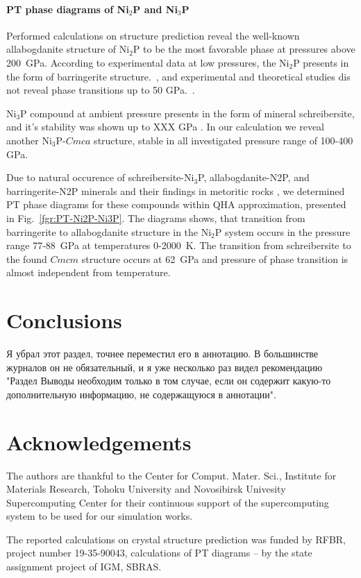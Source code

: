 \documentclass[twoside,twocolumn,9pt]{article}
\begin{document}
\paragraph{PT phase diagrams of Ni$_2$P and Ni$_3$P} 

Performed calculations on structure prediction reveal the well-known allabogdanite structure of Ni$_2$P to be the most favorable phase at pressures above 200~GPa. 
According to experimental data at low pressures, the Ni$_2$P presents in the form of barringerite structure.~\cite{Buseck1969}, and experimental and theoretical studies dis not reveal phase transitions up to 50 GPa.~\cite{Dera-2009-JGR,Nisar-2010-EPSL}.

Ni$_3$P compound at ambient pressure presents in the form of mineral schreibersite, and it's stability was shown up to XXX GPa \cite{skala_m-2003}.
In our calculation we reveal another Ni$_3$P-$Cmca$ structure, stable in all investigated pressure range of 100-400 GPa. 

Due to natural occurence of schreibersite-Ni$_3$P, allabogdanite-N2P, and barringerite-N2P minerals and their findings in metoritic rocks \cite{}, we determined PT phase diagrams for these compounds within QHA approximation, presented in Fig.~\ref{fgr:PT-Ni2P-Ni3P}. 
The diagrams shows, that transition from barringerite to allabogdanite structure in the Ni$_2$P system occurs in the pressure range 77-88~GPa at temperatures 0-2000~K.
The transition from schreibersite to the found $Cmcm$ structure occurs at 62~GPa and pressure of phase transition is almost independent from temperature.


\section{Conclusions}
Я убрал этот раздел, точнее переместил его в аннотацию. В большинстве журналов он не обязательный, и я уже несколько раз видел рекомендацию "Раздел Выводы необходим только в том случае, если он содержит какую-то дополнительную информацию, не содержащуюся в аннотации". 

\section*{Acknowledgements}

The authors are thankful to the Center for Comput. Mater. Sci., Institute for Materials Research, Tohoku University and Novosibirsk Univesity Supercomputing Center for their continuous support of the supercomputing system to be used for our simulation works. 

The reported calculations on crystal structure prediction was funded by RFBR, project number 19-35-90043, calculations of PT diagrams – by the state assignment project of IGM, SBRAS.

\balance
\end{document}

